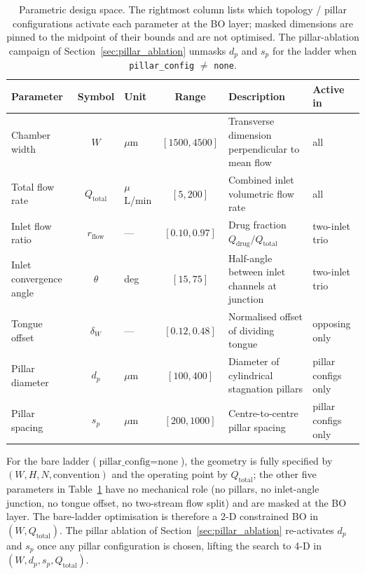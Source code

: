 \documentclass[12pt]{article}
\begin{document}
\begin{table}[htbp]
\centering
\caption{Parametric design space. The rightmost column lists which topology / pillar configurations activate each parameter at the BO layer; masked dimensions are pinned to the midpoint of their bounds and are not optimised. The pillar-ablation campaign of Section~\ref{sec:pillar_ablation} unmasks $d_p$ and $s_p$ for the ladder when \texttt{pillar\_config} $\neq$ \texttt{none}.}
\label{tab:design_space}
\begin{tabular}{l c l c p{3.6cm} l}
\toprule
\textbf{Parameter} & \textbf{Symbol} & \textbf{Unit} & \textbf{Range} & \textbf{Description} & \textbf{Active in} \\
\midrule
Chamber width            & $W$              & $\mu$m       & $[1500, 4500]$ & Transverse dimension perpendicular to mean flow & all \\
Total flow rate          & $Q_{\text{total}}$ & $\mu$L/min & $[5, 200]$    & Combined inlet volumetric flow rate              & all \\
Inlet flow ratio         & $r_{\text{flow}}$ & ---        & $[0.10, 0.97]$& Drug fraction $Q_{\text{drug}}/Q_{\text{total}}$ & two-inlet trio \\
Inlet convergence angle  & $\theta$         & deg          & $[15, 75]$    & Half-angle between inlet channels at junction    & two-inlet trio \\
Tongue offset            & $\delta_{W}$     & ---          & $[0.12, 0.48]$& Normalised offset of dividing tongue             & opposing only \\
Pillar diameter          & $d_{p}$          & $\mu$m       & $[100, 400]$  & Diameter of cylindrical stagnation pillars       & pillar configs only \\
Pillar spacing           & $s_{p}$          & $\mu$m       & $[200, 1000]$ & Centre-to-centre pillar spacing                  & pillar configs only \\
\bottomrule
\end{tabular}
\end{table}

For the bare ladder ($\text{pillar\_config} = \text{none}$), the geometry is fully specified by $(W, H, N, \text{convention})$ and the operating point by $Q_{\text{total}}$; the other five parameters in Table~\ref{tab:design_space} have no mechanical role (no pillars, no inlet-angle junction, no tongue offset, no two-stream flow split) and are masked at the BO layer. The bare-ladder optimisation is therefore a 2-D constrained BO in $(W, Q_{\text{total}})$. The pillar ablation of Section~\ref{sec:pillar_ablation} re-activates $d_p$ and $s_p$ once any pillar configuration is chosen, lifting the search to 4-D in $(W, d_p, s_p, Q_{\text{total}})$.
\end{document}
